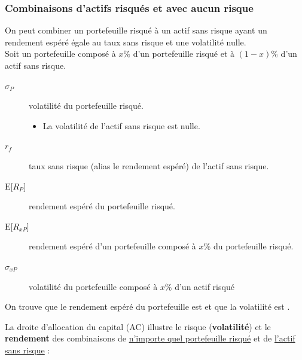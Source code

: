 \documentclass[10pt, french]{article}
\begin{document}
\begin{multicols*}{2}
\columnbreak
\subsubsection{Combinaisons d'actifs risqués et avec aucun risque}
On peut combiner un portefeuille risqué à un actif sans risque ayant un rendement espéré égale au taux sans risque et une volatilité nulle.\\

Soit un portefeuille composé à $x\%$ d'un portefeuille risqué et à $(1 - x)\%$ d'un actif sans risque.
\begin{distributions}[Notation]
\begin{description}
	\item[$\sigma_{P}$]	volatilité du portefeuille risqué.
		\begin{itemize}
		\item	La volatilité de l'actif sans risque est nulle.
		\end{itemize}
	\item[$r_{f}$]	taux sans risque (alias le rendement espéré) de l'actif sans risque.
	\item[$\text{E}\lbrack R_{P}\rbrack$]	rendement espéré du portefeuille risqué.
	\item[$\text{E}\lbrack R_{xP}\rbrack$]	rendement espéré d'un portefeuille composé à $x\%$ du portefeuille risqué.
	\item[$\sigma_{xP}$]	volatilité du portefeuille composé à $x\%$ d'un actif risqué
\end{description}
\end{distributions}

On trouve que le rendement espéré du portefeuille est  et que la volatilité est . 

\begin{definitionNOHFILL}
La droite d'allocation du capital (AC) illustre le risque (\textbf{volatilité}) et le \textbf{rendement} des combinaisons de \underline{n'importe quel portefeuille risqué} et de \underline{l'actif sans risque} :
\begin{center}


\end{center}
\end{definitionNOHFILL}
\end{multicols*}
\end{document}
